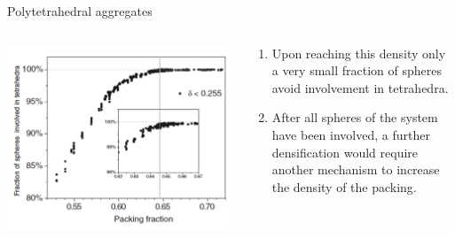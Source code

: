 \documentclass{bredelebeamer}
\begin{document}
\begin{frame}{Polytetrahedral aggregates}
\begin{columns}
\begin{column}{0.5\textwidth}
\includegraphics[scale=0.2]{images/pp7.png}
\end{column}

\begin{column}{0.5\textwidth}
\begin{enumerate}
\item Upon reaching this density only a very
small fraction of spheres avoid involvement in tetrahedra.
\item After all spheres of the system
have been involved, a further densification would require
another mechanism to increase the density of the packing.
\end{enumerate}
\end{column}
\end{columns}
\end{frame}
\end{document}
